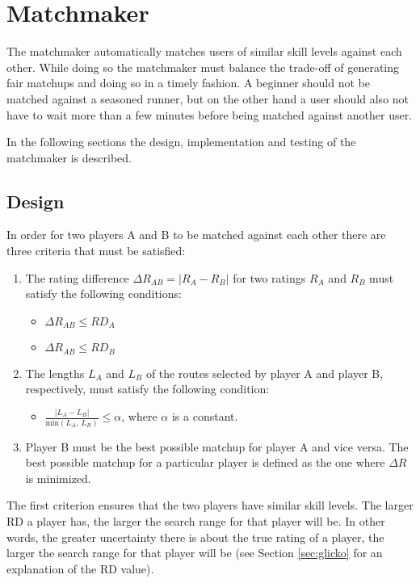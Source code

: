 \section{Matchmaker}
The matchmaker automatically matches users of similar skill levels against each other.
While doing so the matchmaker must balance the trade-off of generating fair matchups and doing so in a timely fashion.
A beginner should not be matched against a seasoned runner, but on the other hand a user should also not have to wait more than a few minutes before being matched against another user.

In the following sections the design, implementation and testing of the matchmaker is described.


\subsection{Design}
In order for two players A and B to be matched against each other there are three criteria that must be satisfied:

\begin{enumerate}
	\item{The rating difference $\Delta R_{AB} = \left|R_A-R_B\right|$ for two ratings $R_A$ and $R_B$ must satisfy the following conditions:}
		\begin{itemize}
			\item{$\Delta R_{AB} \leq RD_A$}
			\item{$\Delta R_{AB} \leq RD_B$}
		\end{itemize}
	\item{The lengths $L_A$ and $L_B$ of the routes selected by player A and player B, respectively, must satisfy the following condition:}
		\begin{itemize}
			\item{$\frac{\left|L_A-L_B\right|}{\mathrm{min}\left(L_A,\:	L_B\right)} \leq \alpha$, where $\alpha$ is a constant.	}
		\end{itemize}
	\item{Player B must be the best possible matchup for player A and vice versa. The best possible matchup for a particular player is defined as the one where $\Delta R$ is minimized.}
\end{enumerate}

The first criterion ensures that the two players have similar skill levels.
The larger RD a player has, the larger the search range for that player will be.
In other words, the greater uncertainty there is about the true rating of a player, the larger the search range for that player will be (see Section \ref{sec:glicko} for an explanation of the RD value).

